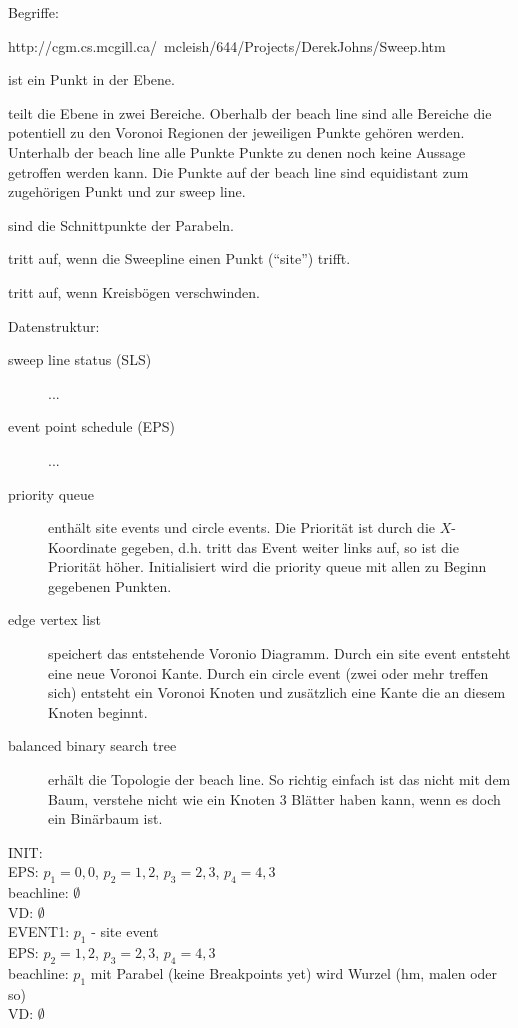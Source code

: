 Begriffe:
\begin{description}
http://cgm.cs.mcgill.ca/~mcleish/644/Projects/DerekJohns/Sweep.htm

\item[site] ist ein Punkt in der Ebene.
\item[beach line] teilt die Ebene in zwei Bereiche. Oberhalb der beach line sind alle Bereiche die potentiell zu den Voronoi Regionen der jeweiligen Punkte gehören werden. Unterhalb der beach line alle Punkte Punkte zu denen noch keine Aussage getroffen werden kann. Die Punkte auf der beach line sind equidistant zum zugehörigen Punkt und zur sweep line.
\item[breakpoint] sind die Schnittpunkte der Parabeln.
\item[site Event] tritt auf, wenn die Sweepline einen Punkt ("`site"') trifft.
\item[circle Event] tritt auf, wenn Kreisbögen verschwinden.
\end{description}

Datenstruktur:
\begin{description}
\item[sweep line status (SLS)] ...
\item[event point schedule (EPS)] ...

\item[priority queue] enthält site events und circle events. Die Priorität ist durch die $X$-Koordinate gegeben, d.h. tritt das Event weiter links auf, so ist die Priorität höher. Initialisiert wird die priority queue mit allen zu Beginn gegebenen Punkten.
\item[edge vertex list] speichert das entstehende Voronio Diagramm. Durch ein site event entsteht eine neue Voronoi Kante. Durch ein circle event (zwei oder mehr treffen sich) entsteht ein Voronoi Knoten und zusätzlich eine Kante die an diesem Knoten beginnt.
\item[balanced binary search tree] erhält die Topologie der beach line. So richtig einfach ist das nicht mit dem Baum, verstehe nicht wie ein Knoten 3 Blätter haben kann, wenn es doch ein Binärbaum ist.
\end{description}

INIT:\\
EPS: $p_1={0,0}$, $p_2={1,2}$, $p_3={2,3}$, $p_4={4,3}$\\
beachline: $\emptyset$\\
VD: $\emptyset$\\

EVENT1: $p_1$ - site event\\
EPS: $p_2={1,2}$, $p_3={2,3}$, $p_4={4,3}$\\
beachline: $p_1$ mit Parabel (keine Breakpoints yet) wird Wurzel (hm, malen oder so)\\
VD: $\emptyset$\\

